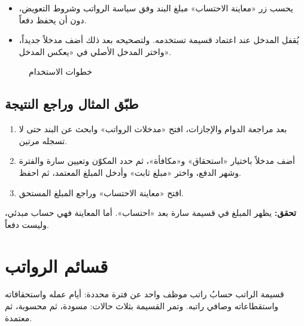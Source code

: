 \begin{itemize}
  \item يحسب زر «معاينة الاحتساب» مبلغ البند وفق سياسة الرواتب وشروط التعويض، دون أن يحفظ دفعاً.
  \item يُقفل المدخل عند اعتماد قسيمة تستخدمه. ولتصحيحه بعد ذلك أضف مدخلاً جديداً، واختر المدخل الأصلي في «يعكس المدخل».
\end{itemize}

\begin{figure}[H]
\centering
{}
\rclegend
\caption{خطوات الاستخدام}
\label{fig:hr-feature-payroll-inputs-flow}
\end{figure}

\subsection{طبّق المثال وراجع النتيجة}

\begin{enumerate}
  \item بعد مراجعة الدوام والإجازات، افتح «مدخلات الرواتب» وابحث عن البند حتى لا تسجله مرتين.
  \item أضف مدخلاً باختيار «استحقاق» و«مكافأة»، ثم حدد المكوّن وتعيين سارة والفترة وشهر الدفع، واختر «مبلغ ثابت» وأدخل المبلغ المعتمد، ثم احفظ.
  \item افتح «معاينة الاحتساب» وراجع المبلغ المستحق.
\end{enumerate}

\textbf{تحقق:} يظهر المبلغ في قسيمة سارة بعد «احتساب». أما المعاينة فهي حساب مبدئي، وليست دفعاً.

\clearpage
\section{قسائم الرواتب}
\label{sec:hr-feature-salary-slips}

قسيمة الراتب حسابُ راتب موظف واحد عن فترة محددة: أيام عمله واستحقاقاته واستقطاعاته وصافي راتبه. وتمر القسيمة بثلاث حالات: مسودة، ثم محسوبة، ثم معتمدة.

